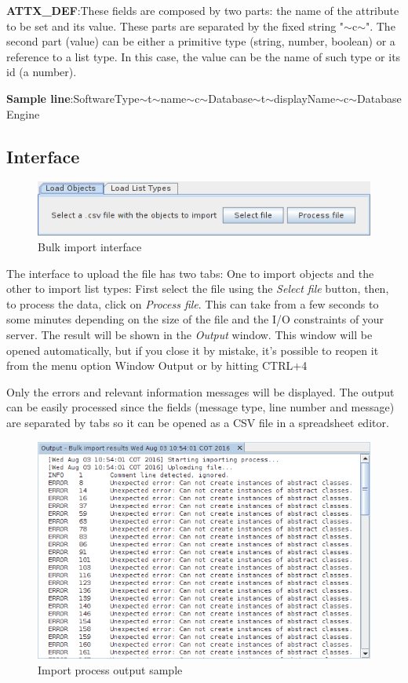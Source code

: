 \documentclass[a4paper]{article}
\begin{document}
	  			\textbf{ATTX\_DEF}:These fields are composed by two parts: the name of the attribute to be set and its value. These parts are separated by the fixed string "$\sim$c$\sim$". The second part (value) can be either a primitive type (string, number, boolean) or a reference to a list type. In this case, the value can be the name of such type or its id (a number). 

	  			\textbf{Sample line}:SoftwareType$\sim$t$\sim$name$\sim$c$\sim$Database$\sim$t$\sim$displayName$\sim$c$\sim$Database Engine

			\subsection{Interface}\label{sec:bi_interface}
			
				\begin{figure}[h!]
					\centering
					\includegraphics[width=0.7\linewidth]{img/bulk_import_main_window.png}
					\caption{Bulk import interface}
					\label{fig:bulk_import_interface}
				\end{figure}					
				The interface to upload the file has two tabs: One to import objects and the other to import list types:
				First select the file using the  \textit{Select file} button, then, to process the data, click on \textit{Process file}. This can take from a few seconds to some minutes depending on the size of the file and the I/O constraints of your server. The result will be shown in the \textit{Output} window. This window will be opened automatically, but if you close it by mistake, it’s possible to reopen it from the menu option Window Output or by hitting CTRL+4

				Only the errors and relevant information messages will be displayed. The output can be easily processed since the fields (message type, line number and message)	are separated by tabs so it can be opened as a CSV file in a spreadsheet editor. 
				
				\begin{figure}[h!]
					\centering
					\includegraphics[width=0.7\linewidth]{img/bulk_import_output_window.png}
					\caption{Import process output sample}
					\label{fig:bulk_import_output_window}
				\end{figure}	
				
\end{document}
